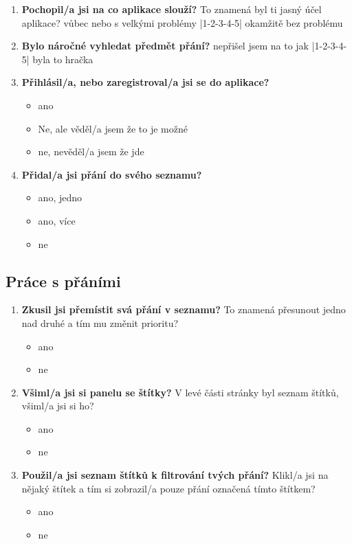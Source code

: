 \begin{enumerate}
\item \textbf{Pochopil/a jsi na co aplikace slouží?} To znamená byl ti jasný účel aplikace? \newline
		vůbec nebo s velkými problémy |1-2-3-4-5| okamžitě bez problému
\item \textbf{Bylo náročné vyhledat předmět přání?} \newline
		nepřišel jsem na to jak |1-2-3-4-5| byla to hračka
\item \textbf{Přihlásil/a, nebo zaregistroval/a jsi se do aplikace?}
		\begin{itemize}
		\item ano
		\item Ne, ale věděl/a jsem že to je možné
		\item ne, nevěděl/a jsem že jde
		\end{itemize}
\item \textbf{Přidal/a jsi přání do svého seznamu?}
		\begin{itemize}
		\item ano, jedno
		\item ano, více
		\item ne
		\end{itemize}
\end{enumerate}

\subsection{Práce s přáními}
\begin{enumerate}
\item \textbf{Zkusil jsi přemístit svá přání v seznamu?} To znamená přesunout jedno nad druhé a tím mu změnit prioritu?
		\begin{itemize}
		\item ano
		\item ne
		\end{itemize}
\item \textbf{Všiml/a jsi si panelu se štítky?} V levé části stránky byl seznam štítků, všiml/a jsi si ho?
		\begin{itemize}
		\item ano
		\item ne
		\end{itemize}
\item \textbf{Použil/a jsi seznam štítků k filtrování tvých přání?} Klikl/a jsi na nějaký štítek a tím si zobrazil/a pouze přání označená tímto štítkem?
		\begin{itemize}
		\item ano
		\item ne
		\end{itemize}
\end{enumerate}

